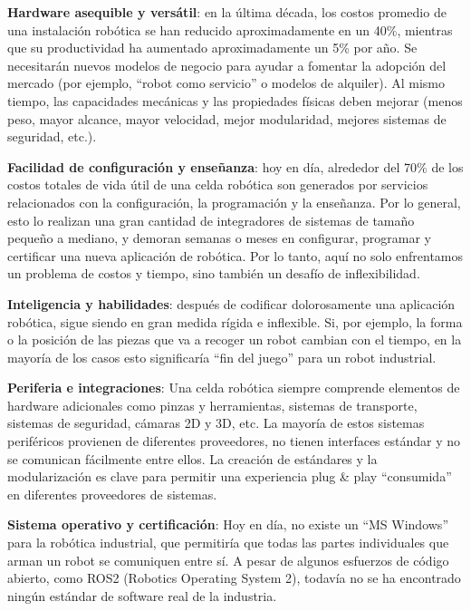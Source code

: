     \begin{item}
        \item \textbf{Hardware asequible y versátil}: en la última década, los costos promedio de una instalación robótica se han reducido aproximadamente en un 40\%, mientras que su productividad ha aumentado aproximadamente un 5\% por año. Se necesitarán nuevos modelos de negocio para ayudar a fomentar la adopción del mercado (por ejemplo, ``robot como servicio'' o modelos de alquiler). Al mismo tiempo, las capacidades mecánicas y las propiedades físicas deben mejorar (menos peso, mayor alcance, mayor velocidad, mejor modularidad, mejores sistemas de seguridad, etc.).
        
        \item \textbf{Facilidad de configuración y enseñanza}: hoy en día, alrededor del 70\% de los costos totales de vida útil de una celda robótica son generados por servicios relacionados con la configuración, la programación y la enseñanza. Por lo general, esto lo realizan una gran cantidad de integradores de sistemas de tamaño pequeño a mediano, y demoran semanas o meses en configurar, programar y certificar una nueva aplicación de robótica. Por lo tanto, aquí no solo enfrentamos un problema de costos y tiempo, sino también un desafío de inflexibilidad. 
        
        \item \textbf{Inteligencia y habilidades}: después de codificar dolorosamente una aplicación robótica, sigue siendo en gran medida rígida e inflexible. Si, por ejemplo, la forma o la posición de las piezas que va a recoger un robot cambian con el tiempo, en la mayoría de los casos esto significaría ``fin del juego'' para un robot industrial.  
        
        \item \textbf{Periferia e integraciones}: Una celda robótica siempre comprende elementos de hardware adicionales como pinzas y herramientas, sistemas de transporte, sistemas de seguridad, cámaras 2D y 3D, etc. La mayoría de estos sistemas periféricos provienen de diferentes proveedores, no tienen interfaces estándar y no se comunican fácilmente entre ellos. La creación de estándares y la modularización es clave para permitir una experiencia plug \& play ``consumida'' en diferentes proveedores de sistemas.
        
        \item \textbf{Sistema operativo y certificación}: Hoy en día, no existe un ``MS Windows'' para la robótica industrial, que permitiría que todas las partes individuales que arman un robot se comuniquen entre sí. A pesar de algunos esfuerzos de código abierto, como ROS2 (Robotics Operating System 2), todavía no se ha encontrado ningún estándar de software real de la industria.
    \end{item}
